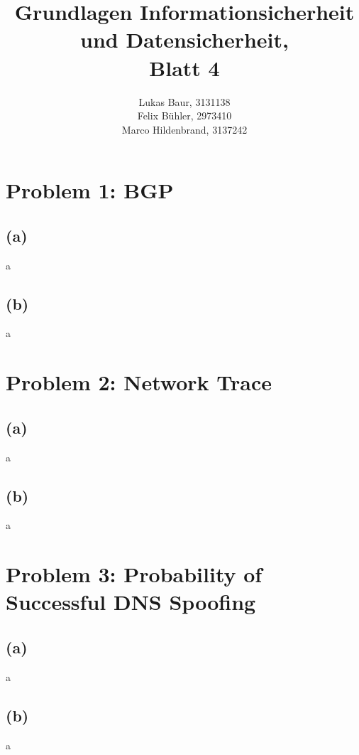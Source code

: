 \documentclass[12pt,pdftex,a4paper]{article}
\begin{document}
\title{ Grundlagen Informationsicherheit und Datensicherheit,\\ Blatt 4}
\author{Lukas Baur, 3131138\\
		Felix Bühler, 2973410\\
		Marco Hildenbrand, 3137242}
\maketitle
\section*{Problem 1: BGP}
\subsection*{(a)}
a

\subsection*{(b)}
a

\section*{Problem 2: Network Trace}
\subsection*{(a)}
a

\subsection*{(b)}
a

\section*{Problem 3: Probability of Successful DNS Spoofing}
\subsection*{(a)}
a

\subsection*{(b)}
a
\end{document}
